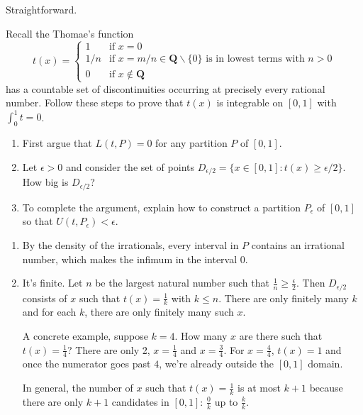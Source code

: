 \documentclass{oxmathproblems}
\begin{document}
\begin{questions}

\miquestion Straightforward.

\miquestion Recall the Thomae's function
\[
  t(x)=
  \begin{cases}
    1 & \text{if } x=0 \\
    1/n & \text{if } x=m/n \in \textbf{Q} \backslash \{0\} \text{ is in lowest terms with } n > 0 \\
    0 & \text{if } x \notin \textbf{Q}
  \end{cases}
\]
has a countable set of discontinuities occurring at precisely every rational number. Follow these steps to prove that $t(x)$ is integrable on $[0, 1]$ with $\int_{0}^{1}t=0$.
\begin{enumerate}[label=(\alph*)]
  \item First argue that $L(t, P)=0$ for any partition $P$ of $[0, 1]$.
  \item Let $\epsilon > 0$ and consider the set of points $D_{\epsilon/2}=\{x \in [0, 1] : t(x) \geq \epsilon/2\}$. How big is $D_{\epsilon/2}$?
  \item To complete the argument, explain how to construct a partition $P_{\epsilon}$ of $[0, 1]$ so that $U(t, P_{\epsilon}) < \epsilon$.
\end{enumerate}

\begin{solution}
  \begin{enumerate}[label=(\alph*)]
    \item By the density of the irrationals, every interval in $P$ contains an irrational number, which makes the infimum in the interval 0.
  
    \item It's finite. Let $n$ be the largest natural number such that $\frac{1}{n} \geq \frac{\epsilon}{2}$. Then $D_{\epsilon/2}$ consists
    of $x$ such that $t(x)=\frac{1}{k}$ with $k \leq n$. There are only finitely many $k$ and for each $k$, there are only finitely many such $x$.

    A concrete example, suppose $k=4$. How many $x$ are there such that $t(x)=\frac{1}{4}$? There are only 2, $x=\frac{1}{4}$ and $x=\frac{3}{4}$.
    For $x=\frac{4}{4}$, $t(x)=1$ and once the numerator goes past $4$, we're already outside the $[0, 1]$ domain.
    
    In general, the number of $x$ such that $t(x)=\frac{1}{k}$ is at most $k+1$ because there are only $k+1$ candidates in $[0, 1]$:
    $\frac{0}{k}$ up to $\frac{k}{k}$.


\end{enumerate}
\end{solution}
\end{questions}
\end{document}
